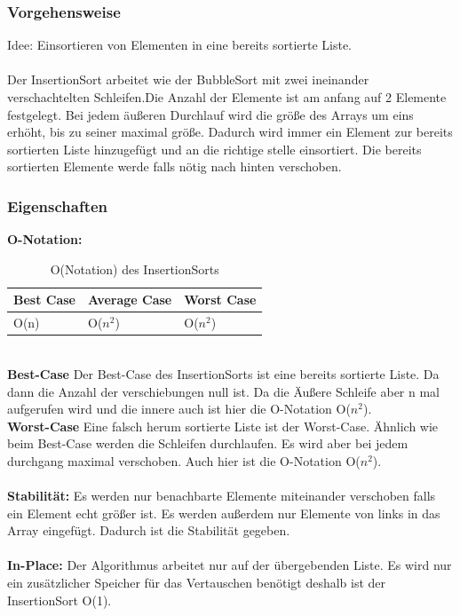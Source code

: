 \documentclass{article}
\begin{document}
\subsubsection{Vorgehensweise}
Idee: Einsortieren von Elementen in eine bereits sortierte Liste. \\ \\
Der InsertionSort arbeitet wie der BubbleSort mit zwei ineinander verschachtelten Schleifen.Die Anzahl der Elemente ist am anfang auf 2 Elemente festgelegt. Bei jedem äußeren Durchlauf wird die größe des Arrays um eins erhöht, bis zu seiner maximal größe. Dadurch wird immer ein Element zur bereits sortierten Liste hinzugefügt und an die richtige stelle einsortiert. Die bereits sortierten Elemente werde falls nötig nach hinten verschoben.

\subsubsection{Eigenschaften}
\textbf{O-Notation:}
\begin{table}[h]
\centering
\begin{tabular}{lll}
	\hline
	\textbf{Best Case} & \textbf{Average Case} & \textbf{Worst Case} \\
	\hline
	O(n) & O($n^{2}$) & O($n^{2}$) \\
	\hline
\end{tabular}
\caption{O(Notation) des InsertionSorts \cite{ONotationen}}
\label{tab:InsertionSort}
\end{table}
\\
\textbf{Best-Case} Der Best-Case des InsertionSorts ist eine bereits sortierte Liste. Da dann die Anzahl der verschiebungen null ist. Da die Äußere Schleife aber n mal aufgerufen wird und die innere auch ist hier die O-Notation O($n^{2}$). \\
\textbf{Worst-Case} Eine falsch herum sortierte Liste ist der Worst-Case. Ähnlich wie beim Best-Case werden die Schleifen durchlaufen. Es wird aber bei jedem durchgang maximal verschoben. Auch hier ist die O-Notation O($n^{2}$).\\ \\
\textbf{Stabilität:}  Es werden nur benachbarte Elemente miteinander verschoben falls ein Element echt größer ist. Es werden außerdem nur Elemente von links in das Array eingefügt. Dadurch ist die Stabilität gegeben.\\ \\
\textbf{In-Place:}  Der Algorithmus arbeitet nur auf der übergebenden Liste. Es wird nur ein zusätzlicher Speicher für das Vertauschen benötigt deshalb ist der InsertionSort O(1).\\
\end{document}
